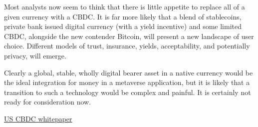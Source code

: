 Most analysts now seem to think that there is little appetite to replace all of a given currency with a CBDC. It is far more likely that a blend of stablecoins, private bank issued digital currency (with a yield incentive) and some limited CBDC, alongside the new contender Bitcoin, will present a new landscape of user choice. Different models of trust, insurance, yields, acceptability, and potentially privacy, will emerge. \par
Clearly a global, stable, wholly digital bearer asset in a native currency would be the ideal integration for money in a metaverse application, but it is likely that a transition to such a technology would be complex and painful. It is certainly not ready for consideration now.

\href{https://www.federalreserve.gov/publications/files/money-and-payments-20220120.pdf}{US CBDC whitepaper}


